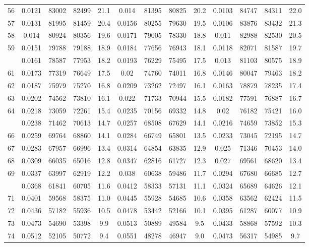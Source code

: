 \documentclass[
  14pt,
]{article}
\begin{document}
\begin{longtable}[t]{lcccccccccccc}
56 & 0.0121 & 83002 & 82499 & 21.1 & 0.014 & 81395 & 80825 & 20.2 & 0.0103 & 84747 & 84311 & 22.0\\
57 & 0.0131 & 81995 & 81459 & 20.4 & 0.0156 & 80255 & 79630 & 19.5 & 0.0106 & 83876 & 83432 & 21.3\\
58 & 0.014 & 80924 & 80356 & 19.6 & 0.0171 & 79005 & 78330 & 18.8 & 0.011 & 82988 & 82530 & 20.5\\
59 & 0.0151 & 79788 & 79188 & 18.9 & 0.0184 & 77656 & 76943 & 18.1 & 0.0118 & 82071 & 81587 & 19.7\\
\addlinespace
60 & 0.0161 & 78587 & 77953 & 18.2 & 0.0193 & 76229 & 75495 & 17.5 & 0.013 & 81103 & 80575 & 18.9\\
61 & 0.0173 & 77319 & 76649 & 17.5 & 0.02 & 74760 & 74011 & 16.8 & 0.0146 & 80047 & 79463 & 18.2\\
62 & 0.0187 & 75979 & 75270 & 16.8 & 0.0209 & 73262 & 72497 & 16.1 & 0.0163 & 78879 & 78235 & 17.4\\
63 & 0.0202 & 74562 & 73810 & 16.1 & 0.022 & 71733 & 70944 & 15.5 & 0.0182 & 77591 & 76887 & 16.7\\
64 & 0.0218 & 73059 & 72261 & 15.4 & 0.0235 & 70156 & 69332 & 14.8 & 0.02 & 76182 & 75421 & 16.0\\
\addlinespace
65 & 0.0238 & 71462 & 70613 & 14.7 & 0.0257 & 68508 & 67629 & 14.1 & 0.0216 & 74659 & 73852 & 15.3\\
66 & 0.0259 & 69764 & 68860 & 14.1 & 0.0284 & 66749 & 65801 & 13.5 & 0.0233 & 73045 & 72195 & 14.7\\
67 & 0.0283 & 67957 & 66996 & 13.4 & 0.0314 & 64854 & 63835 & 12.9 & 0.025 & 71346 & 70453 & 14.0\\
68 & 0.0309 & 66035 & 65016 & 12.8 & 0.0347 & 62816 & 61727 & 12.3 & 0.027 & 69561 & 68620 & 13.4\\
69 & 0.0337 & 63997 & 62919 & 12.2 & 0.038 & 60638 & 59486 & 11.7 & 0.0294 & 67680 & 66685 & 12.7\\
\addlinespace
70 & 0.0368 & 61841 & 60705 & 11.6 & 0.0412 & 58333 & 57131 & 11.1 & 0.0324 & 65689 & 64626 & 12.1\\
71 & 0.0401 & 59568 & 58375 & 11.0 & 0.0445 & 55928 & 54685 & 10.6 & 0.0358 & 63562 & 62424 & 11.5\\
72 & 0.0436 & 57182 & 55936 & 10.5 & 0.0478 & 53442 & 52166 & 10.1 & 0.0395 & 61287 & 60077 & 10.9\\
73 & 0.0473 & 54690 & 53398 & 9.9 & 0.0513 & 50889 & 49584 & 9.5 & 0.0433 & 58868 & 57592 & 10.3\\
74 & 0.0512 & 52105 & 50772 & 9.4 & 0.0551 & 48278 & 46947 & 9.0 & 0.0473 & 56317 & 54985 & 9.7\\

\end{longtable}
\end{document}
